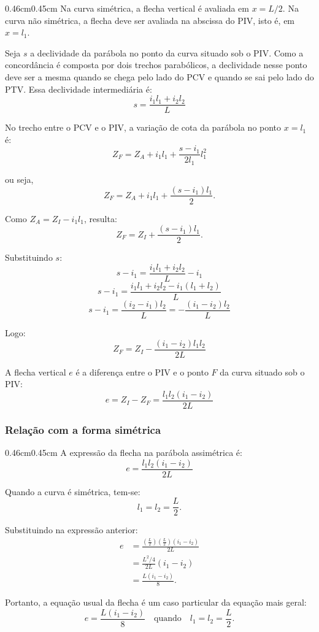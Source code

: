 \documentclass[12pt,letterpaper]{article}
\newenvironment{corpo}{\begin{adjustwidth}{0.46cm}{0.45cm}\justifying}{\end{adjustwidth}}
\begin{document}
\begin{corpo}
Na curva simétrica, a flecha vertical é avaliada em $x=L/2$. Na curva não simétrica, a flecha deve ser avaliada na abscissa do PIV, isto é, em $x=l_1$.

Seja $s$ a declividade da parábola no ponto da curva situado sob o PIV. Como a concordância é composta por dois trechos parabólicos, a declividade nesse ponto deve ser a mesma quando se chega pelo lado do PCV e quando se sai pelo lado do PTV. Essa declividade intermediária é:
\[
 s=\frac{i_1l_1+i_2l_2}{L}
\]

No trecho entre o PCV e o PIV, a variação de cota da parábola no ponto $x=l_1$ é:
\[
 Z_F=Z_A+i_1l_1+\frac{s-i_1}{2l_1}l_1^2
\]

ou seja,
\[
 Z_F=Z_A+i_1l_1+\frac{(s-i_1)l_1}{2}.
\]

Como $Z_A=Z_I-i_1l_1$, resulta:
\[
 Z_F=Z_I+\frac{(s-i_1)l_1}{2}.
\]

Substituindo $s$:
\[
 s-i_1=\frac{i_1l_1+i_2l_2}{L}-i_1
\]
\[
 s-i_1=\frac{i_1l_1+i_2l_2-i_1(l_1+l_2)}{L}
\]
\[
 s-i_1=\frac{(i_2-i_1)l_2}{L}=-\frac{(i_1-i_2)l_2}{L}
\]

Logo:
\[
 Z_F=Z_I-\frac{(i_1-i_2)l_1l_2}{2L}
\]

A flecha vertical $e$ é a diferença entre o PIV e o ponto $F$ da curva situado sob o PIV:
\[
 e=Z_I-Z_F=\frac{l_1l_2(i_1-i_2)}{2L}
\]
\end{corpo}

\subsubsection*{Relação com a forma simétrica}

\begin{corpo}
A expressão da flecha na parábola assimétrica é:
\[
 e=\frac{l_1l_2(i_1-i_2)}{2L}
\]

Quando a curva é simétrica, tem-se:
\[
 l_1=l_2=\frac{L}{2}.
\]

Substituindo na expressão anterior:
\[
\begin{aligned}
e
&=\frac{\left(\frac{L}{2}\right)\left(\frac{L}{2}\right)(i_1-i_2)}{2L} \\
&=\frac{L^2/4}{2L}(i_1-i_2) \\
&=\frac{L(i_1-i_2)}{8}.
\end{aligned}
\]

Portanto, a equação usual da flecha é um caso particular da equação mais geral:
\[
 e=\frac{L(i_1-i_2)}{8}\quad \text{quando}\quad l_1=l_2=\frac{L}{2}.
\]
\end{corpo}
\end{document}
